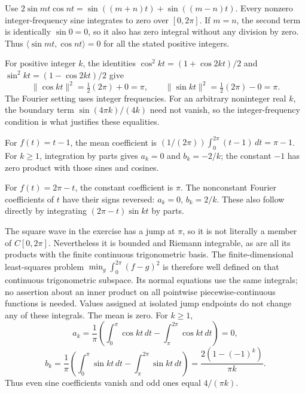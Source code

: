 Use $2\sin mt\cos nt=\sin((m+n)t)+\sin((m-n)t)$.
Every nonzero integer-frequency sine integrates to zero over $[0,2\pi]$.
If $m=n$, the second term is identically $\sin0=0$, so it also
has zero integral without any division by zero. Thus
$\langle\sin mt,\cos nt\rangle=0$ for all the stated positive integers.

For positive integer $k$, the identities
$\cos^2kt=(1+\cos2kt)/2$ and
$\sin^2kt=(1-\cos2kt)/2$ give
\[
 \|\cos kt\|^2=\tfrac12(2\pi)+0=\pi,\qquad
 \|\sin kt\|^2=\tfrac12(2\pi)-0=\pi.
\]
The Fourier setting uses integer frequencies. For an arbitrary noninteger
real $k$, the boundary term $\sin(4\pi k)/(4k)$ need not vanish,
so the integer-frequency condition is what justifies these equalities.

For $f(t)=t-1$, the mean coefficient is
$(1/(2\pi))\int_0^{2\pi}(t-1)\,dt=\pi-1$.
For $k\ge1$, integration by parts gives $a_k=0$ and $b_k=-2/k$;
the constant $-1$ has zero product with those sines and cosines.

For $f(t)=2\pi-t$, the constant coefficient is $\pi$.
The nonconstant Fourier coefficients of $t$ have their signs reversed:
$a_k=0$, $b_k=2/k$. These also follow directly by integrating
$(2\pi-t)\sin kt$ by parts.

The square wave in the exercise has a jump at $\pi$, so it is not
literally a member of $C[0,2\pi]$. Nevertheless it is bounded and
Riemann integrable, as are all its products with the finite continuous
trigonometric basis. The finite-dimensional least-squares problem
$\min_g\int_0^{2\pi}(f-g)^2$ is therefore well defined on that
continuous trigonometric subspace. Its normal equations use the
same integrals; no assertion about an inner product on all pointwise
piecewise-continuous functions is needed. Values assigned at isolated
jump endpoints do not change any of these integrals.
The mean is zero. For $k\ge1$,
\[
 a_k=\frac1\pi\left(\int_0^\pi\cos kt\,dt
 -\int_\pi^{2\pi}\cos kt\,dt\right)=0,
\]
\[
 b_k=\frac1\pi\left(\int_0^\pi\sin kt\,dt
 -\int_\pi^{2\pi}\sin kt\,dt\right)
 =\frac{2(1-(-1)^k)}{\pi k}.
\]
Thus even sine coefficients vanish and odd ones equal $4/(\pi k)$.

